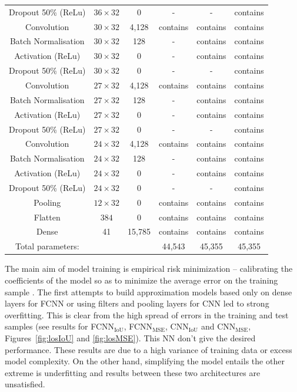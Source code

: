 \documentclass[aerospace,article,submit,moreauthors,pdftex]{Definitions/mdpi}
\begin{document}
\begin{table}[]
\begin{tabular}{c c c c c c}
        Dropout 50\% (ReLu)        & $36 \times 32$ & 0 & - & - & contains\\
        Convolution                 & $30 \times 32$ & 4,128 & contains & contains & contains\\
        Batch Normalisation         & $30 \times 32$ & 128 & - & contains & contains\\
        Activation (ReLu)           & $30 \times 32$ & 0 & - & contains & contains\\
        Dropout 50\% (ReLu)        & $30 \times 32$ & 0 & - & - & contains\\
        Convolution                 & $27 \times 32$ & 4,128 & contains & contains & contains\\
        Batch Normalisation         & $27 \times 32$ & 128 & - & contains & contains\\
        Activation (ReLu)           & $27 \times 32$ & 0 & - & contains & contains\\
        Dropout 50\% (ReLu)        & $27 \times 32$ & 0 & - & - & contains\\
        Convolution                 & $24 \times 32$ & 4,128 & contains & contains & contains\\
        Batch Normalisation         & $24 \times 32$ & 128 & - & contains & contains\\
        Activation (ReLu)           & $24 \times 32$ & 0 & - & contains & contains\\
        Dropout 50\% (ReLu)        & $24 \times 32$ & 0 & - & - & contains\\
        Pooling                     & $12 \times 32$ & 0 & contains & contains & contains\\
        Flatten                     & $384$ & 0 & contains & contains & contains\\
        Dense                       & 41 & 15,785 & contains & contains & contains\\
        \midrule
        Total parameters: & & & 44,543 & 45,355 & 45,355
    \end{tabular}
    \label{tab:CNN}
\end{table}

The main aim of model training is empirical risk minimization -- calibrating the coefficients of the model so as to minimize the average error on the training sample \cite{vapnik1992principles}. The first attempts to build approximation models based only on dense layers for FCNN or using filters and pooling layers for CNN led to strong overfitting. This is clear from the high spread of errors in the training and test samples (see results for FCNN$_{\text{IoU}}$, FCNN$_{\text{MSE}}$, CNN$_{\text{IoU}}$ and CNN$_{\text{MSE}}$, Figures~\ref{fig:losIoU} and \ref{fig:losMSE}). This NN don't give the desired performance. These results are due to a high variance of training data or excess model complexity. On the other hand, simplifying the model entails the other extreme is underfitting and results between these two architectures are unsatisfied.
\end{document}

